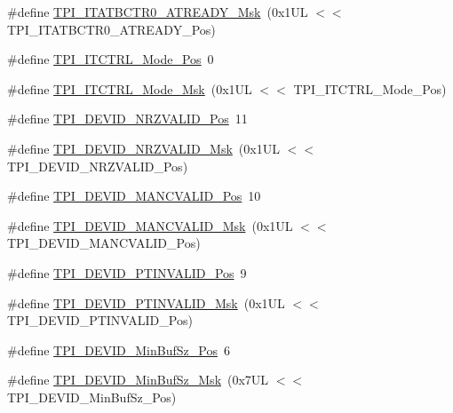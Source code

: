 \begin{DoxyCompactItemize}
\item 
\#define \mbox{\hyperlink{group___c_m_s_i_s___t_p_i_gaee320b3c60f9575aa96a8742c4ff9356}{T\+P\+I\+\_\+\+I\+T\+A\+T\+B\+C\+T\+R0\+\_\+\+A\+T\+R\+E\+A\+D\+Y\+\_\+\+Msk}}~(0x1\+U\+L $<$$<$ T\+P\+I\+\_\+\+I\+T\+A\+T\+B\+C\+T\+R0\+\_\+\+A\+T\+R\+E\+A\+D\+Y\+\_\+\+Pos)
\item 
\#define \mbox{\hyperlink{group___c_m_s_i_s___t_p_i_gaa847adb71a1bc811d2e3190528f495f0}{T\+P\+I\+\_\+\+I\+T\+C\+T\+R\+L\+\_\+\+Mode\+\_\+\+Pos}}~0
\item 
\#define \mbox{\hyperlink{group___c_m_s_i_s___t_p_i_gad6f87550b468ad0920d5f405bfd3f017}{T\+P\+I\+\_\+\+I\+T\+C\+T\+R\+L\+\_\+\+Mode\+\_\+\+Msk}}~(0x1\+U\+L $<$$<$ T\+P\+I\+\_\+\+I\+T\+C\+T\+R\+L\+\_\+\+Mode\+\_\+\+Pos)
\item 
\#define \mbox{\hyperlink{group___c_m_s_i_s___t_p_i_ga9f46cf1a1708575f56d6b827766277f4}{T\+P\+I\+\_\+\+D\+E\+V\+I\+D\+\_\+\+N\+R\+Z\+V\+A\+L\+I\+D\+\_\+\+Pos}}~11
\item 
\#define \mbox{\hyperlink{group___c_m_s_i_s___t_p_i_gacecc8710a8f6a23a7d1d4f5674daf02a}{T\+P\+I\+\_\+\+D\+E\+V\+I\+D\+\_\+\+N\+R\+Z\+V\+A\+L\+I\+D\+\_\+\+Msk}}~(0x1\+U\+L $<$$<$ T\+P\+I\+\_\+\+D\+E\+V\+I\+D\+\_\+\+N\+R\+Z\+V\+A\+L\+I\+D\+\_\+\+Pos)
\item 
\#define \mbox{\hyperlink{group___c_m_s_i_s___t_p_i_ga675534579d9e25477bb38970e3ef973c}{T\+P\+I\+\_\+\+D\+E\+V\+I\+D\+\_\+\+M\+A\+N\+C\+V\+A\+L\+I\+D\+\_\+\+Pos}}~10
\item 
\#define \mbox{\hyperlink{group___c_m_s_i_s___t_p_i_ga4c3ee4b1a34ad1960a6b2d6e7e0ff942}{T\+P\+I\+\_\+\+D\+E\+V\+I\+D\+\_\+\+M\+A\+N\+C\+V\+A\+L\+I\+D\+\_\+\+Msk}}~(0x1\+U\+L $<$$<$ T\+P\+I\+\_\+\+D\+E\+V\+I\+D\+\_\+\+M\+A\+N\+C\+V\+A\+L\+I\+D\+\_\+\+Pos)
\item 
\#define \mbox{\hyperlink{group___c_m_s_i_s___t_p_i_ga974cccf4c958b4a45cb71c7b5de39b7b}{T\+P\+I\+\_\+\+D\+E\+V\+I\+D\+\_\+\+P\+T\+I\+N\+V\+A\+L\+I\+D\+\_\+\+Pos}}~9
\item 
\#define \mbox{\hyperlink{group___c_m_s_i_s___t_p_i_ga1ca84d62243e475836bba02516ba6b97}{T\+P\+I\+\_\+\+D\+E\+V\+I\+D\+\_\+\+P\+T\+I\+N\+V\+A\+L\+I\+D\+\_\+\+Msk}}~(0x1\+U\+L $<$$<$ T\+P\+I\+\_\+\+D\+E\+V\+I\+D\+\_\+\+P\+T\+I\+N\+V\+A\+L\+I\+D\+\_\+\+Pos)
\item 
\#define \mbox{\hyperlink{group___c_m_s_i_s___t_p_i_ga3f7da5de2a34be41a092e5eddd22ac4d}{T\+P\+I\+\_\+\+D\+E\+V\+I\+D\+\_\+\+Min\+Buf\+Sz\+\_\+\+Pos}}~6
\item 
\#define \mbox{\hyperlink{group___c_m_s_i_s___t_p_i_ga939e068ff3f1a65b35187ab34a342cd8}{T\+P\+I\+\_\+\+D\+E\+V\+I\+D\+\_\+\+Min\+Buf\+Sz\+\_\+\+Msk}}~(0x7\+U\+L $<$$<$ T\+P\+I\+\_\+\+D\+E\+V\+I\+D\+\_\+\+Min\+Buf\+Sz\+\_\+\+Pos)

\end{DoxyCompactItemize}
